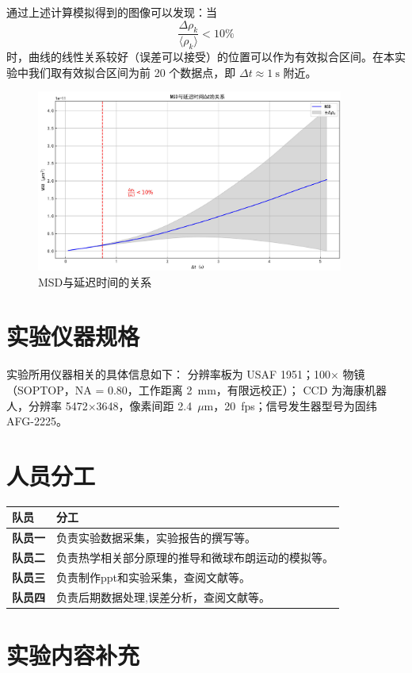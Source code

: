 \documentclass[a4paper]{report} %
\begin{document}
通过上述计算模拟得到的图像可以发现：当 
\[
\frac{\Delta \rho_k}{\langle \rho_k \rangle} < 10\%
\]
时，曲线的线性关系较好（误差可以接受）的位置可以作为有效拟合区间。在本实验中我们取有效拟合区间为前 20 个数据点，即 $\Delta t \approx 1 \ \text{s}$ 附近。

\begin{figure}[H]
    \centering
    \includegraphics[width=0.9\textwidth]{取1.jpg}
    \caption{MSD与延迟时间的关系}
    \label{fig:let1}
\end{figure}
\section{实验仪器规格}
实验所用仪器相关的具体信息如下：
分辨率板为 USAF 1951；100$\times$ 物镜（SOPTOP，NA = 0.80，工作距离 2~mm，有限远校正）；
CCD 为海康机器人，分辨率 5472$\times$3648，像素间距 2.4~$\mu$m，20~fps；信号发生器型号为固纬 AFG-2225。
\section{人员分工}
\renewcommand{\arraystretch}{1.3} %

\begin{tabularx}{\textwidth}{>{\bfseries}l X}
\toprule
队员 & 分工 \\
\midrule
队员一 & 负责实验数据采集，实验报告的撰写等。 \\
队员二 & 负责热学相关部分原理的推导和微球布朗运动的模拟等。 \\
队员三 & 负责制作ppt和实验采集，查阅文献等。 \\
队员四 & 负责后期数据处理,误差分析，查阅文献等。 \\
\bottomrule
\end{tabularx}

\section{实验内容补充}
\end{document}
